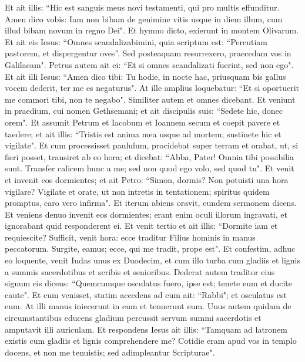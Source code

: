 \begin{biblechapter}
\verse Et ait illis: “Hic est sanguis meus novi testamenti, qui pro multis effunditur. 
\verse Amen dico vobis: Iam non bibam de genimine vitis usque in diem illum, cum illud bibam novum in regno Dei". 
\verse Et hymno dicto, exierunt in montem Olivarum. 
\verse Et ait eis Iesus: “Omnes scandalizabimini, quia scriptum est: “Percutiam pastorem, et dispergentur oves”. 
\verse Sed posteaquam resurrexero, praecedam vos in Galilaeam". 
\verse Petrus autem ait ei: “Et si omnes scandalizati fuerint, sed non ego". 
\verse Et ait illi Iesus: “Amen dico tibi: Tu hodie, in nocte hac, priusquam bis gallus vocem dederit, ter me es negaturus". 
\verse At ille amplius loquebatur: “Et si oportuerit me commori tibi, non te negabo". Similiter autem et omnes dicebant. 
\verse Et veniunt in praedium, cui nomen Gethsemani; et ait discipulis suis: “Sedete hic, donec orem". 
\verse Et assumit Petrum et Iacobum et Ioannem secum et coepit pavere et taedere; 
\verse et ait illis: “Tristis est anima mea usque ad mortem; sustinete hic et vigilate". 
\verse Et cum processisset paululum, procidebat super terram et orabat, ut, si fieri posset, transiret ab eo hora;  
\verse et dicebat: “Abba, Pater! Omnia tibi possibilia sunt. Transfer calicem hunc a me; sed non quod ego volo, sed quod tu". 
\verse Et venit et invenit eos dormientes; et ait Petro: “Simon, dormis? Non potuisti una hora vigilare?  
\verse Vigilate et orate, ut non intretis in tentationem; spiritus quidem promptus, caro vero infirma". 
\verse Et iterum abiens oravit, eundem sermonem dicens.  
\verse Et veniens denuo invenit eos dormientes; erant enim oculi illorum ingravati, et ignorabant quid responderent ei. 
\verse Et venit tertio et ait illis: “Dormite iam et requiescite? Sufficit, venit hora: ecce traditur Filius hominis in manus peccatorum. 
\verse Surgite, eamus; ecce, qui me tradit, prope est". 
\verse Et confestim, adhuc eo loquente, venit Iudas unus ex Duodecim, et cum illo turba cum gladiis et lignis a summis sacerdotibus et scribis et senioribus.  
\verse Dederat autem traditor eius signum eis dicens: “Quemcumque osculatus fuero, ipse est; tenete eum et ducite caute". 
\verse Et cum venisset, statim accedens ad eum ait: “Rabbi"; et osculatus est eum. 
\verse At illi manus iniecerunt in eum et tenuerunt eum. 
\verse Unus autem quidam de circumstantibus educens gladium percussit servum summi sacerdotis et amputavit illi auriculam. 
\verse Et respondens Iesus ait illis: “Tamquam ad latronem existis cum gladiis et lignis comprehendere me? 
\verse Cotidie eram apud vos in templo docens, et non me tenuistis; sed adimpleantur Scripturae". 

\end{biblechapter}
